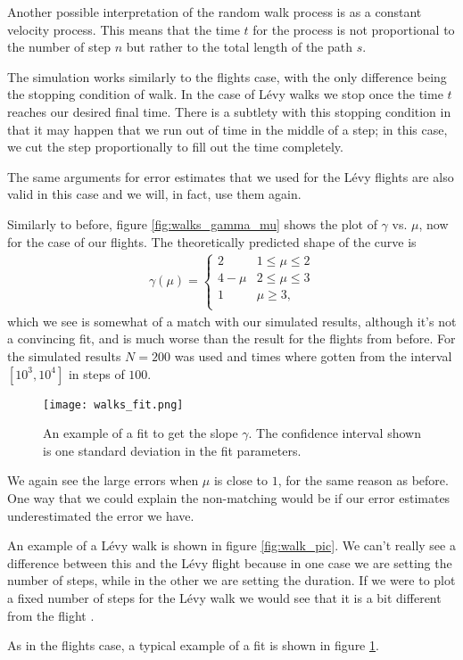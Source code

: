 \documentclass[10pt,a4paper,twocolumn]{article}
\begin{document}
Another possible interpretation of the random walk process is as a constant velocity process. This means that the time $t$ for the process is not proportional to the number of step $n$ but rather to the total length of the path $s$.

The simulation works similarly to the flights case, with the only difference being the stopping condition of walk. In the case of L\'evy walks we stop once the time $t$ reaches our desired final time. There is a subtlety with this stopping condition in that it may happen that we run out of time in the middle of a step; in this case, we cut the step proportionally to fill out the time completely.

The same arguments for error estimates that we used for the L\'evy flights are also valid in this case and we will, in fact, use them again.

Similarly to before, figure \ref{fig:walks_gamma_mu} shows the plot of $\gamma$ vs. $\mu$, now for the case of our flights. The theoretically predicted shape of the curve is
%
\begin{align}
\gamma(\mu)= \begin{cases} 
      2 & 1 \leq \mu \leq 2 \\
      4 - \mu & 2 \leq \mu \leq 3 \\
      1 & \mu \geq 3, \\
   \end{cases}
\end{align}
%
which we see is somewhat of a match with our simulated results, although it's not a convincing fit, and is much worse than the result for the flights from before. For the simulated results $N = 200$ was used and times where gotten from the interval $[10^3, 10^4]$ in steps of $100$.

\begin{figure}[h]
\centering
\captionsetup{justification=centering}
\texttt{[image: walks\_fit.png]}
\caption{An example of a fit to get the slope $\gamma$. The confidence interval shown is one standard deviation in the fit parameters.}
\label{fig:walks_fit}
\end{figure}

We again see the large errors when $\mu$ is close to $1$, for the same reason as before. One way that we could explain the non-matching would be if our error estimates underestimated the error we have.

An example of a L\'evy walk is shown in figure \ref{fig:walk_pic}. We can't really see a difference between this and the L\'evy flight because in one case we are setting the number of steps, while in the other we are setting the duration. If we were to plot a fixed number of steps for the L\'evy walk we would see that it is a bit different from the flight \cite{wvsl}.

As in the flights case, a typical example of a fit is shown in figure \ref{fig:walks_fit}.

\printbibliography
\end{document}
